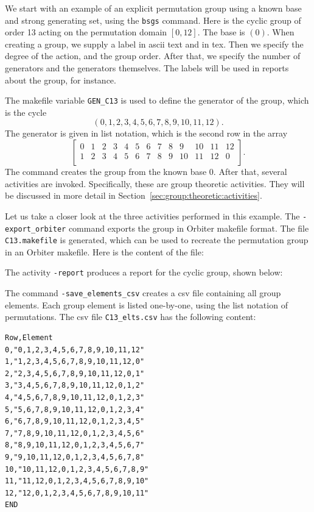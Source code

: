 We start with an example of an explicit permutation group using a known base and strong generating set, 
using the \verb'bsgs' command.
Here is the cyclic group of order 13 acting on the permutation domain $[0,12]$. 
The base is $(0)$. When creating a group, we supply a label in ascii text and in tex. 
Then we specify the degree of the action, and the group order. 
After that, we specify the number of generators and the generators themselves.
The labels will be used in reports about the group, for instance. 
{\tt

}
{\tt

}
The makefile variable \verb'GEN_C13' is used to define the generator of the group, which is 
the cycle 
$$
(0,1,2,3,4,5,6,7,8,9,10,11,12).
$$
The generator is given in list notation, which is the second row in the array
$$
\left[
\begin{array}{ccccccccccccc}
0&1&2&3&4&5&6&7&8&9&10&11&12\\
1&2&3&4&5&6&7&8&9&10&11&12&0\\
\end{array}
\right].
$$
The command creates the group from the known base $0$. 
After that, several activities are invoked.
Specifically, these are group theoretic activities. 
They will be discussed in more detail in Section~\ref{sec:group:theoretic:activities}.

\bigskip

Let us take a closer look at the three activities performed in this example.
The \verb'-export_orbiter' command 
exports the group in Orbiter makefile format.
The file \verb'C13.makefile' is generated,
which can be used to recreate the permutation group in an Orbiter makefile. 
Here is the content of the file:
{\tt

}

\bigskip

The activity \verb'-report'
produces a report for the cyclic group, shown below:

\begin{mdframed}[style=MyFrame]

\end{mdframed}

\bigskip


The command  \verb'-save_elements_csv'
creates a csv file containing all group elements. 
Each group element is listed one-by-one, using the list notation of permutations.
The csv file \verb'C13_elts.csv' has the following content:
\begin{verbatim}
Row,Element
0,"0,1,2,3,4,5,6,7,8,9,10,11,12"
1,"1,2,3,4,5,6,7,8,9,10,11,12,0"
2,"2,3,4,5,6,7,8,9,10,11,12,0,1"
3,"3,4,5,6,7,8,9,10,11,12,0,1,2"
4,"4,5,6,7,8,9,10,11,12,0,1,2,3"
5,"5,6,7,8,9,10,11,12,0,1,2,3,4"
6,"6,7,8,9,10,11,12,0,1,2,3,4,5"
7,"7,8,9,10,11,12,0,1,2,3,4,5,6"
8,"8,9,10,11,12,0,1,2,3,4,5,6,7"
9,"9,10,11,12,0,1,2,3,4,5,6,7,8"
10,"10,11,12,0,1,2,3,4,5,6,7,8,9"
11,"11,12,0,1,2,3,4,5,6,7,8,9,10"
12,"12,0,1,2,3,4,5,6,7,8,9,10,11"
END
\end{verbatim}



